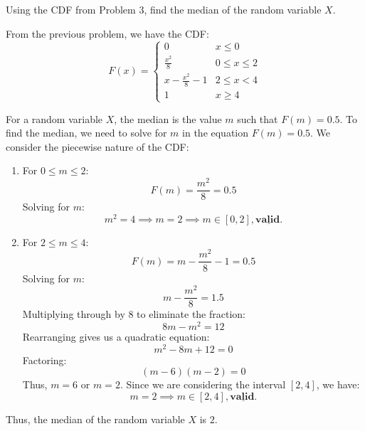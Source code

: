 \documentclass[a4paper, 10pt]{article}
\begin{document}
\newpage

\begin{problem}
Using the CDF from Problem 3, find the median of the random variable \( X \).
\end{problem}

\begin{solution}
From the previous problem, we have the CDF:
\[
F(x) = \begin{cases}
    0 & x \leq 0 \\
    \frac{x^2}{8} & 0 \leq x \leq 2 \\
    x - \frac{x^2}{8} - 1 & 2 \leq x < 4 \\
    1 & x \geq 4
\end{cases}
\]

For a random variable \( X \), the median is the value \( m \) such that \( F(m) = 0.5 \).
To find the median, we need to solve for \( m \) in the equation \( F(m) = 0.5 \).
We consider the piecewise nature of the CDF:
\begin{enumerate}
    \item For \( 0 \leq m \leq 2 \):
    \[
    F(m) = \frac{m^2}{8} = 0.5
    \]
    Solving for \( m \):
    \[
    m^2 = 4 \implies m = 2 \implies m \in [0, 2], \underline{\textbf{valid.}}
    \]
    
    \item For \( 2 \leq m \leq 4 \):
    \[
    F(m) = m - \frac{m^2}{8} - 1 = 0.5
    \]
    Solving for \( m \):
    \[
    m - \frac{m^2}{8} = 1.5
    \]
    Multiplying through by 8 to eliminate the fraction:
    \[
    8m - m^2 = 12
    \]
    Rearranging gives us a quadratic equation:
    \[
    m^2 - 8m + 12 = 0
    \]
    Factoring:
    \[
    (m - 6)(m - 2) = 0
    \]
    Thus, \( m = 6 \) or \( m = 2 \). Since we are considering the interval \( [2, 4] \), we have:
    \[
    m = 2 \implies m \in [2, 4], \underline{\textbf{valid.}}
    \]
\end{enumerate}

Thus, the median of the random variable \( X \) is \( \boxed{2} \).
\end{solution}

\newpage
\end{document}
